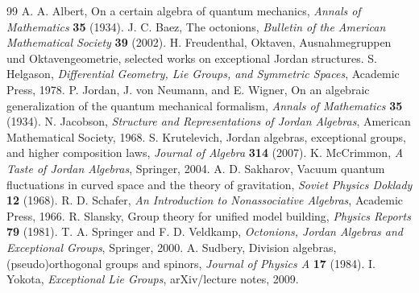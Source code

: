 \documentclass[11pt]{article}
\theoremstyle{plain}
\theoremstyle{definition}
\theoremstyle{remark}
\begin{document}
\begin{thebibliography}{99}
A. A. Albert,
On a certain algebra of quantum mechanics,
\emph{Annals of Mathematics} \textbf{35} (1934).
J. C. Baez,
The octonions,
\emph{Bulletin of the American Mathematical Society} \textbf{39} (2002).
H. Freudenthal,
Oktaven, Ausnahmegruppen und Oktavengeometrie,
selected works on exceptional Jordan structures.
S. Helgason,
\emph{Differential Geometry, Lie Groups, and Symmetric Spaces},
Academic Press, 1978.
P. Jordan, J. von Neumann, and E. Wigner,
On an algebraic generalization of the quantum mechanical formalism,
\emph{Annals of Mathematics} \textbf{35} (1934).
N. Jacobson,
\emph{Structure and Representations of Jordan Algebras},
American Mathematical Society, 1968.
S. Krutelevich,
Jordan algebras, exceptional groups, and higher composition laws,
\emph{Journal of Algebra} \textbf{314} (2007).
K. McCrimmon,
\emph{A Taste of Jordan Algebras},
Springer, 2004.
A. D. Sakharov,
Vacuum quantum fluctuations in curved space and the theory of gravitation,
\emph{Soviet Physics Doklady} \textbf{12} (1968).
R. D. Schafer,
\emph{An Introduction to Nonassociative Algebras},
Academic Press, 1966.
R. Slansky,
Group theory for unified model building,
\emph{Physics Reports} \textbf{79} (1981).
T. A. Springer and F. D. Veldkamp,
\emph{Octonions, Jordan Algebras and Exceptional Groups},
Springer, 2000.
A. Sudbery,
Division algebras, (pseudo)orthogonal groups and spinors,
\emph{Journal of Physics A} \textbf{17} (1984).
I. Yokota,
\emph{Exceptional Lie Groups},
arXiv/lecture notes, 2009.
\end{thebibliography}
\end{document}

